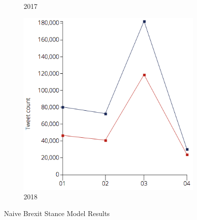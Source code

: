 \documentclass[11pt]{report}
\begin{document}
\begin{figure}[H]
\begin{subfigure}[b]{0.33\textwidth}
                \caption{2017}
                \label{fig:gull2}
        \end{subfigure}%
        \begin{subfigure}[b]{0.30\textwidth}
                \includegraphics[width=\linewidth]{images/2018-naive.png}
                \caption{2018}
                \label{fig:tiger}
        \end{subfigure}%

        \caption{Naive Brexit Stance Model Results}\label{fig:naive-results}
\end{figure}
\end{document}
